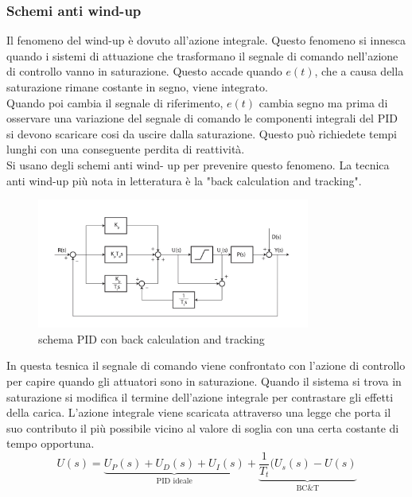 \subsubsection{Schemi anti wind-up}
Il fenomeno del wind-up è dovuto all’azione integrale. Questo fenomeno si innesca quando i sistemi di attuazione che trasformano il segnale di comando nell’azione di controllo vanno in saturazione. Questo accade quando $e(t)$, che a causa della saturazione  rimane costante in segno, viene integrato.\\
Quando poi cambia il segnale di riferimento, $e(t)$ cambia segno ma prima di osservare una variazione del segnale di comando le componenti integrali del PID si devono scaricare cosi da uscire dalla saturazione. Questo può richiedete tempi lunghi con una conseguente perdita di reattività. \\
Si usano degli schemi anti wind- up per prevenire questo fenomeno. La tecnica anti wind-up più nota in letteratura  è la  "back calculation and tracking". \\
 \begin{figure}[h]
      \centering
      \includegraphics[width=0.8\textwidth]{img/anti wind-up.JPG}
      \caption{schema PID con back calculation and tracking}
      \label{img:antiwindup}
    \end{figure}
In questa tesnica il segnale di comando viene confrontato con l'azione di controllo per capire quando gli attuatori sono in saturazione. Quando il sistema si trova in saturazione si modifica il termine dell'azione integrale per contrastare gli effetti della carica. L'azione integrale viene scaricata attraverso una legge che porta il suo contributo il più possibile vicino al valore di soglia con una certa costante di tempo opportuna.
\begin{equation}
U(s)=\underbrace{U_P(s)+U_D(s)+U_I(s)}_\text{PID ideale}+\underbrace{\frac{1}{T_t}(U_s(s)-U(s)}_\text{BC\&T}
\end{equation}
